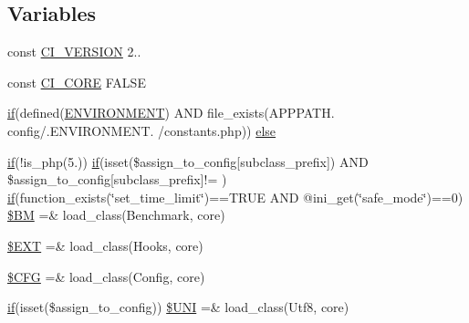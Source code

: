 \subsection*{Variables}
\begin{DoxyCompactItemize}
\item 
const \hyperlink{_code_igniter_8php_a32e3c3927ba8ec93df92327dfd85d564}{C\+I\+\_\+\+V\+E\+R\+S\+I\+ON} \textquotesingle{}2..\textquotesingle{}
\item 
const \hyperlink{_code_igniter_8php_aefc9cd12024bd0164da3aeafe9635c30}{C\+I\+\_\+\+C\+O\+RE} F\+A\+L\+SE
\item 
\hyperlink{jquery_8tokeninput_8js_ad8dd46a3cbc004569e34401e9e71771a}{if}(defined(\textquotesingle{}\hyperlink{vendors_2tinymce_2plugins_2jbimages_2ci_2index_8php_a8757a57d09df5349f8b93b2083e29a1e}{E\+N\+V\+I\+R\+O\+N\+M\+E\+NT}\textquotesingle{}) A\+ND file\+\_\+exists(A\+P\+P\+P\+A\+T\+H. \textquotesingle{}config/\textquotesingle{}.E\+N\+V\+I\+R\+O\+N\+M\+E\+N\+T. \textquotesingle{}/constants.\+php\textquotesingle{})) \hyperlink{_code_igniter_8php_a92382071610da06a8cb62a44c4530e10}{else}
\item 
\hyperlink{jquery_8tokeninput_8js_ad8dd46a3cbc004569e34401e9e71771a}{if}(!is\+\_\+php(\textquotesingle{}5.\textquotesingle{})) \hyperlink{jquery_8tokeninput_8js_ad8dd46a3cbc004569e34401e9e71771a}{if}(isset(\$assign\+\_\+to\+\_\+config\mbox{[}\textquotesingle{}subclass\+\_\+prefix\textquotesingle{}\mbox{]}) A\+ND \$assign\+\_\+to\+\_\+config\mbox{[}\textquotesingle{}subclass\+\_\+prefix\textquotesingle{}\mbox{]}!= \textquotesingle{}\textquotesingle{}) \hyperlink{jquery_8tokeninput_8js_ad8dd46a3cbc004569e34401e9e71771a}{if}(function\+\_\+exists(\char`\"{}set\+\_\+time\+\_\+limit\char`\"{})==T\+R\+UE A\+ND @ini\+\_\+get(\char`\"{}safe\+\_\+mode\char`\"{})==0) \hyperlink{_code_igniter_8php_a00c84dd4b16006bcf296997b833ebfac}{\$\+BM} =\& load\+\_\+class(\textquotesingle{}Benchmark\textquotesingle{}, \textquotesingle{}core\textquotesingle{})
\item 
\hyperlink{_code_igniter_8php_ab97aae9bc0aae04b84d360a29a3c035b}{\$\+E\+XT} =\& load\+\_\+class(\textquotesingle{}Hooks\textquotesingle{}, \textquotesingle{}core\textquotesingle{})
\item 
\hyperlink{_code_igniter_8php_adb9373e11e42b2cd55d1fe249ae72deb}{\$\+C\+FG} =\& load\+\_\+class(\textquotesingle{}Config\textquotesingle{}, \textquotesingle{}core\textquotesingle{})
\item 
\hyperlink{jquery_8tokeninput_8js_ad8dd46a3cbc004569e34401e9e71771a}{if}(isset(\$assign\+\_\+to\+\_\+config)) \hyperlink{_code_igniter_8php_a0eedd12db0d3774c174f0dba59577357}{\$\+U\+NI} =\& load\+\_\+class(\textquotesingle{}Utf8\textquotesingle{}, \textquotesingle{}core\textquotesingle{})

\end{DoxyCompactItemize}
